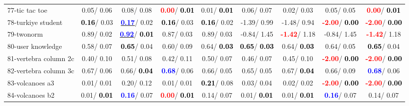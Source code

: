 \begin{table}[h]
\begin{center}
\begin{tabular}{lc|c|c|c|c|c|c|c}
77-tic tac toe &   0.05/  0.06 &   0.08/  0.08 & \textcolor{red}{\textbf{  0.00}}/\textcolor{black}{\textbf{  0.01}} &   0.01/\textcolor{black}{\textbf{  0.01}} &   0.06/  0.07 &   0.02/  0.03 &   0.05/  0.05 & \textcolor{red}{\textbf{  0.00}}/\textcolor{black}{\textbf{  0.01}} \\
78-turkiye student & \textcolor{black}{\textbf{  0.16}}/  0.03 & \underline{\textcolor{blue}{\textbf{  0.17}}}/  0.02 & \textcolor{black}{\textbf{  0.16}}/  0.03 & \textcolor{black}{\textbf{  0.16}}/  0.02 &  -1.39/  0.99 &  -1.48/  0.94 & \textcolor{red}{\textbf{ -2.00}}/\textcolor{black}{\textbf{  0.00}} & \textcolor{red}{\textbf{ -2.00}}/\textcolor{black}{\textbf{  0.00}} \\ \hline
79-twonorm &   0.89/  0.02 & \underline{\textcolor{blue}{\textbf{  0.92}}}/\textcolor{black}{\textbf{  0.01}} &   0.87/  0.03 &   0.89/  0.03 &  -0.84/  1.45 & \textcolor{red}{\textbf{ -1.42}}/  1.18 &  -0.84/  1.45 & \textcolor{red}{\textbf{ -1.42}}/  1.18 \\
80-user knowledge &   0.58/  0.07 & \textcolor{black}{\textbf{  0.65}}/  0.04 &   0.60/  0.09 &   0.64/\textcolor{black}{\textbf{  0.03}} & \textcolor{black}{\textbf{  0.65}}/\textcolor{black}{\textbf{  0.03}} &   0.64/\textcolor{black}{\textbf{  0.03}} &   0.64/  0.05 & \textcolor{black}{\textbf{  0.65}}/  0.04 \\
81-vertebra column 2c &   0.40/  0.10 &   0.51/  0.08 &   0.42/  0.11 &   0.50/  0.07 &   0.46/  0.07 &   0.45/  0.10 & \textcolor{red}{\textbf{ -2.00}}/\textcolor{black}{\textbf{  0.00}} & \textcolor{red}{\textbf{ -2.00}}/\textcolor{black}{\textbf{  0.00}} \\
82-vertebra column 3c &   0.67/  0.06 &   0.66/\textcolor{black}{\textbf{  0.04}} & \textcolor{blue}{\textbf{  0.68}}/  0.06 &   0.66/  0.05 &   0.65/  0.05 &   0.67/\textcolor{black}{\textbf{  0.04}} &   0.66/  0.09 & \textcolor{blue}{\textbf{  0.68}}/  0.06 \\
83-volcanoes a3 &   0.01/  0.01 &   0.20/  0.12 &   0.01/  0.01 & \textcolor{black}{\textbf{  0.21}}/  0.08 &   0.03/  0.04 &   0.02/  0.02 & \textcolor{red}{\textbf{ -2.00}}/\textcolor{black}{\textbf{  0.00}} & \textcolor{red}{\textbf{ -2.00}}/\textcolor{black}{\textbf{  0.00}} \\
84-volcanoes b2 &   0.01/\textcolor{black}{\textbf{  0.01}} & \textcolor{blue}{\textbf{  0.16}}/  0.07 & \textcolor{red}{\textbf{  0.00}}/\textcolor{black}{\textbf{  0.01}} &   0.14/  0.07 &   0.01/\textcolor{black}{\textbf{  0.01}} &   0.01/\textcolor{black}{\textbf{  0.01}} & \textcolor{blue}{\textbf{  0.16}}/  0.07 &   0.14/  0.07 \\

\end{tabular}
\end{center}
\end{table}

